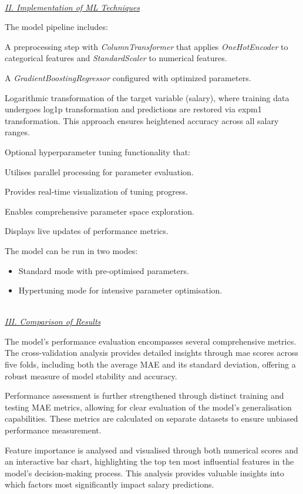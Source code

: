 \documentclass[11pt,a4paper]{article}
\newcommand{\SubItem}[1]{
  {\setlength\itemindent{13pt} \item[◦] #1}
}
\newcommand{\subsubsubsection}[1]{
  {\setlength\itemindent{13pt} \textit{\uline{\\#1\\}}} 
}
\begin{document}
\subsubsubsection{II. Implementation of ML Techniques}
The model pipeline includes:
\begin{itemize}
\item A preprocessing step with \textit{ColumnTransformer} that applies \textit{OneHotEncoder} to categorical features and \textit{StandardScaler} to numerical features.
\item A \textit{GradientBoostingRegressor} configured with optimized parameters.
\item Logarithmic transformation of the target variable (salary), where training data undergoes log1p transformation and predictions are restored via expm1 transformation. This approach ensures heightened accuracy across all salary ranges.
\item Optional hyperparameter tuning functionality that:
\SubItem{Utilises parallel processing for parameter evaluation.}
\SubItem{Provides real-time visualization of tuning progress.}
\SubItem{Enables comprehensive parameter space exploration.}
\SubItem{Displays live updates of performance metrics.}
\end{itemize}

The model can be run in two modes:
\begin{itemize}
\item Standard mode with pre-optimised parameters.
\item Hypertuning mode for intensive parameter optimisation.
\end{itemize}

\subsubsubsection{III. Comparison of Results}
The model's performance evaluation encompasses several comprehensive metrics. The cross-validation analysis provides detailed insights through \acrfull{mae} scores across five folds, including both the average MAE and its standard deviation, offering a robust measure of model stability and accuracy.

Performance assessment is further strengthened through distinct training and testing MAE metrics, allowing for clear evaluation of the model's generalisation capabilities. These metrics are calculated on separate datasets to ensure unbiased performance measurement.

Feature importance is analysed and visualised through both numerical scores and an interactive bar chart, highlighting the top ten most influential features in the model's decision-making process. This analysis provides valuable insights into which factors most significantly impact salary predictions.
\end{document}
